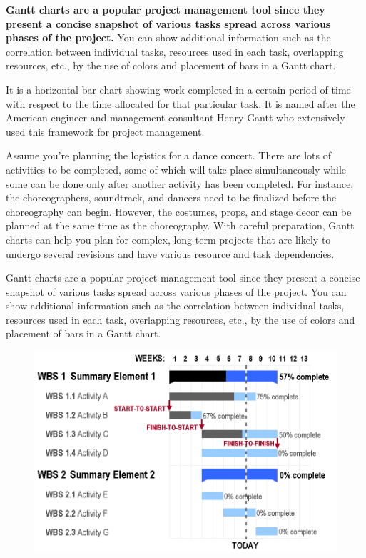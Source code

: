 \documentclass[]{book}
\theoremstyle{definition}
\theoremstyle{definition}
\theoremstyle{definition}
\theoremstyle{remark}
\begin{document}
\textbf{Gantt charts are a popular project management tool since they
present a concise snapshot of various tasks spread across various phases
of the project.} You can show additional information such as the
correlation between individual tasks, resources used in each task,
overlapping resources, etc., by the use of colors and placement of bars
in a Gantt chart.

It is a horizontal bar chart showing work completed in a certain period
of time with respect to the time allocated for that particular task. It
is named after the American engineer and management consultant Henry
Gantt who extensively used this framework for project management.

Assume you're planning the logistics for a dance concert. There are lots
of activities to be completed, some of which will take place
simultaneously while some can be done only after another activity has
been completed. For instance, the choreographers, soundtrack, and
dancers need to be finalized before the choreography can begin. However,
the costumes, props, and stage decor can be planned at the same time as
the choreography. With careful preparation, Gantt charts can help you
plan for complex, long-term projects that are likely to undergo several
revisions and have various resource and task dependencies.

Gantt charts are a popular project management tool since they present a
concise snapshot of various tasks spread across various phases of the
project. You can show additional information such as the correlation
between individual tasks, resources used in each task, overlapping
resources, etc., by the use of colors and placement of bars in a Gantt
chart.

\begin{figure}
\centering
\includegraphics{images/aya-gantt.png}
\caption{}
\end{figure}
\end{document}

